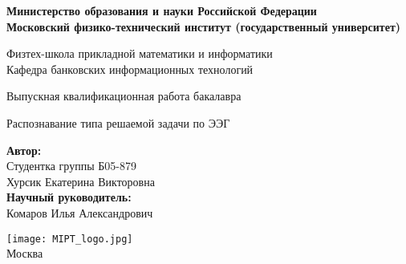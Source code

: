 \begin{center}
    \large\textbf{Министерство образования и науки Российской Федерации \\
    Московский физико-технический институт (государственный
    университет)} \\
    \vspace{1cm}

    Физтех-школа прикладной математики и информатики \\

    Кафедра банковских информационных технологий \\

    \vspace{3em}

    Выпускная квалификационная работа бакалавра
\end{center}

\begin{center}
    \vspace{\fill}
    \LARGE{Распознавание типа решаемой задачи по ЭЭГ}

    \vspace{\fill}
\end{center}


\begin{flushright}
    \textbf{Автор:} \\
    Студентка группы Б05-879 \\
    Хурсик Екатерина Викторовна \\
    \vspace{2em}
    \textbf{Научный руководитель:} \\
    Комаров Илья Александрович
\end{flushright}

\vspace{7em}

\begin{center}
    \texttt{[image: MIPT\_logo.jpg]}\\
    Москва \the\year{}
\end{center}


